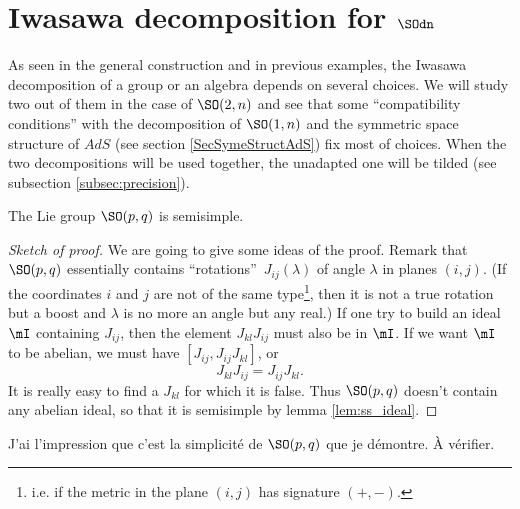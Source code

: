 \section{Iwasawa decomposition for \texorpdfstring{$\SOdn$}{SO2n}} \label{subsecIwasawa_un}

As seen in the general construction and in previous examples, the Iwasawa decomposition of a group or an algebra depends on several choices. We will study two out of them in the case of $\SO(2,n)$ and see that some ``compatibility conditions'' with the decomposition of $\SO(1,n)$ and the symmetric space structure of $AdS$ (see section \ref{SecSymeStructAdS}) fix most of choices. When the two decompositions will be used together, the unadapted one will be tilded (see subsection \ref{subsec:precision}).

\begin{lemma}
The Lie group $\SO(p,q)$ is semisimple.
\label{lem:SO_pq_ss}
\end{lemma}

\begin{proof}[Sketch of proof]
We are going to give some ideas of the proof. Remark that $\SO(p,q)$ essentially contains ``rotations''\ $J_{ij}(\lambda)$ of angle $\lambda$ in planes $(i,j)$. (If the coordinates $i$ and $j$ are not of the same type\footnote{i.e. if the metric in the plane $(i,j)$ has signature $(+,-)$.}, then it is not a true rotation but a boost and $\lambda$ is no more an angle but any real.) If one try to build an ideal $\mI$ containing $J_{ij}$, then the element $J_{kl}J_{ij}$ must also be in $\mI$. If we want $\mI$ to be abelian, we must have $[J_{ij},J_{ij}J_{kl}]$, or
\[
  J_{kl}J_{ij}=J_{ij}J_{kl}.
\]
It is really easy to find a $J_{kl}$ for which it is false. Thus $\SO(p,q)$ doesn't contain any abelian ideal, so that it is semisimple by lemma \ref{lem:ss_ideal}.
\end{proof}

\begin{probleme}
J'ai l'impression que c'est la simplicité de $\SO(p,q)$ que je démontre. À vérifier.
\end{probleme}

